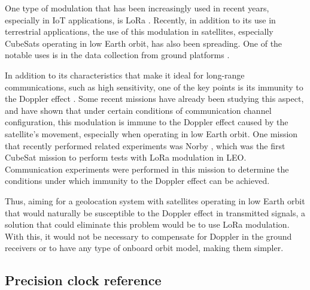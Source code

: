 
One type of modulation that has been increasingly used in recent years, especially in IoT applications, is LoRa \cite{lora}. Recently, in addition to its use in terrestrial applications, the use of this modulation in satellites, especially CubeSats operating in low Earth orbit, has also been spreading. One of the notable uses is in the data collection from ground platforms \cite{anantachaisilp2020}.

In addition to its characteristics that make it ideal for long-range communications, such as high sensitivity, one of the key points is its immunity to the Doppler effect \cite{doroshkin2019} \cite{cao2021}. Some recent missions have already been studying this aspect, and have shown that under certain conditions of communication channel configuration, this modulation is immune to the Doppler effect caused by the satellite's movement, especially when operating in low Earth orbit. One mission that recently performed related experiments was Norby \cite{zadorozhny2022}, which was the first CubeSat mission to perform tests with LoRa modulation in LEO. Communication experiments were performed in this mission to determine the conditions under which immunity to the Doppler effect can be achieved.

Thus, aiming for a geolocation system with satellites operating in low Earth orbit that would naturally be susceptible to the Doppler effect in transmitted signals, a solution that could eliminate this problem would be to use LoRa modulation. With this, it would not be necessary to compensate for Doppler in the ground receivers or to have any type of onboard orbit model, making them simpler.

\subsection{Precision clock reference}


